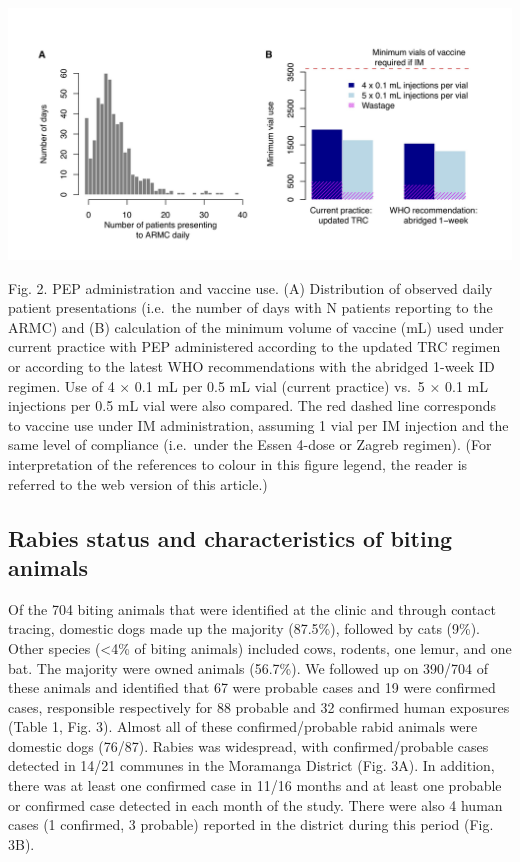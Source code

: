 \documentclass[
]{book}
\begin{document}
\includegraphics[width=0.95\linewidth]{figs/ch1/fig2}

Fig. 2. PEP administration and vaccine use. (A) Distribution of observed daily patient presentations (i.e.~the number of days with N patients reporting to the ARMC) and (B) calculation of the minimum volume of vaccine (mL) used under current practice with PEP administered according to the updated TRC regimen or according to the latest WHO recommendations with the abridged 1-week ID regimen. Use of 4 × 0.1 mL per 0.5 mL vial (current practice) vs.~5 × 0.1 mL injections per 0.5 mL vial were also compared. The red dashed line corresponds to vaccine use under IM administration, assuming 1 vial per IM injection and the same level of compliance (i.e.~under the Essen 4-dose or Zagreb regimen). (For interpretation of the references to colour in this figure legend, the reader is referred to the web version of this article.)

\hypertarget{rabies-status-and-characteristics-of-biting-animals}{%
\subsection{Rabies status and characteristics of biting animals}\label{rabies-status-and-characteristics-of-biting-animals}}

Of the 704 biting animals that were identified at the clinic and through contact tracing, domestic dogs made up the majority (87.5\%), followed by cats (9\%). Other species (\textless4\% of biting animals) included cows, rodents, one lemur, and one bat. The majority were owned animals (56.7\%). We followed up on 390/704 of these animals and identified that 67 were probable cases and 19 were confirmed cases, responsible respectively for 88 probable and 32 confirmed human exposures (Table 1, Fig. 3). Almost all of these confirmed/probable rabid animals were domestic dogs (76/87). Rabies was widespread, with confirmed/probable cases detected in 14/21 communes in the Moramanga District (Fig. 3A). In addition, there was at least one confirmed case in 11/16 months and at least one probable or confirmed case detected in each month of the study. There were also 4 human cases (1 confirmed, 3 probable) reported in the district during this period (Fig. 3B).
\end{document}
